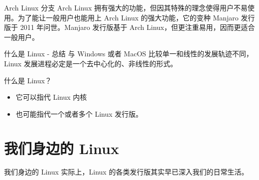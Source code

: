 \documentclass[UTF8]{ctexbeamer}
\begin{document}
\begin{frame}{Arch Linux 分支}
    Arch Linux 拥有强大的功能，但因其特殊的理念使得用户不易使用。为了能让一般用户也能用上 Arch Linux 的强大功能，它的变种 Manjaro 发行版于 2011 年问世。Manjaro 发行版基于 Arch Linux，但更注重易用，因而更适合一般用户。
\end{frame}
\begin{frame}{什么是 Linux - 总结}
    与 Windows 或者 MacOS 比较单一和线性的发展轨迹不同，Linux 发展进程必定是一个去中心化的、非线性的形式。

    什么是 Linux？
    \begin{itemize}
        \item 它可以指代 Linux 内核
        \item 也可能指代一个或者多个 Linux 发行版。
    \end{itemize}
\end{frame}
\section{我们身边的 Linux}
\begin{frame}{我们身边的 Linux}
    实际上，Linux 的各类发行版其实早已深入我们的日常生活。
\end{frame}
\end{document}
